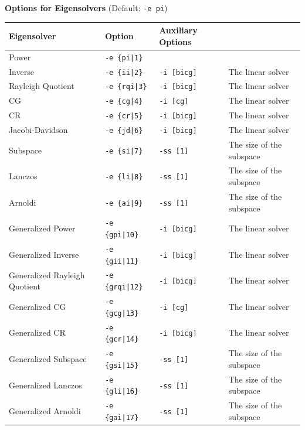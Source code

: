 \documentclass[a4paper]{article}
\begin{document}
\begin{minipage}[t]{\textwidth}
\begin{center}
{\bf Options for Eigensolvers} (Default: \verb=-e pi=) \\
\begin{tabular}{l|lll}\hline\hline
 Eigensolver      & Option              &  Auxiliary Options  & \\ \hline
\hline
 Power                             & \verb=-e {pi|1}=        &    \\ 
 Inverse                           & \verb=-e {ii|2}=        &
 \verb=-i [bicg]= & The linear solver \\
 Rayleigh Quotient                 & \verb=-e {rqi|3}=       &
 \verb=-i [bicg]= & The linear solver \\
 CG                                & \verb=-e {cg|4}=        &
 \verb=-i [cg]= & The linear solver \\ 
 CR                                & \verb=-e {cr|5}=        &
 \verb=-i [bicg]= & The linear solver \\ 
 Jacobi-Davidson                   & \verb=-e {jd|6}=        &
 \verb=-i [bicg]= & The linear solver \\ 
 Subspace                          & \verb=-e {si|7}=        &
 \verb=-ss [1]= & The size of the subspace \\
 Lanczos                           & \verb=-e {li|8}=        &
 \verb=-ss [1]= & The size of the subspace \\
 Arnoldi                           & \verb=-e {ai|9}=        &
 \verb=-ss [1]= & The size of the subspace \\
 Generalized Power                 & \verb=-e {gpi|10}=      &
 \verb=-i [bicg]= & The linear solver \\ 
 Generalized Inverse               & \verb=-e {gii|11}=      & 
 \verb=-i [bicg]= & The linear solver \\
 Generalized Rayleigh Quotient     & \verb=-e {grqi|12}=      & 
 \verb=-i [bicg]= & The linear solver \\ 
 Generalized CG                    & \verb=-e {gcg|13}=      & 
 \verb=-i [cg]= & The linear solver \\
 Generalized CR                    & \verb=-e {gcr|14}=      & 
 \verb=-i [bicg]= & The linear solver \\
 Generalized Subspace              & \verb=-e {gsi|15}=      &
 \verb=-ss [1]= & The size of the subspace \\
 Generalized Lanczos               & \verb=-e {gli|16}=      &
 \verb=-ss [1]= & The size of the subspace \\
 Generalized Arnoldi               & \verb=-e {gai|17}=      &
 \verb=-ss [1]= & The size of the subspace \\  
\hline         
\end{tabular}
\end{center}
\end{minipage}
\end{document}
